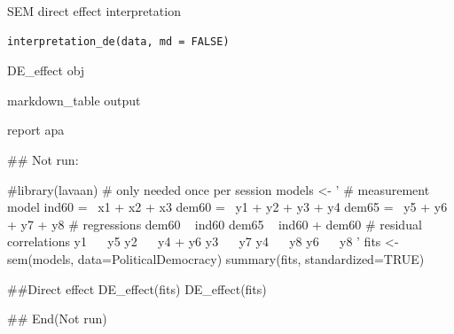 \documentclass[a4paper]{book}
\begin{document}
%
\begin{Description}
SEM direct effect interpretation
\end{Description}
%
\begin{Usage}
\begin{verbatim}
interpretation_de(data, md = FALSE)
\end{verbatim}
\end{Usage}
%
\begin{Arguments}
\begin{ldescription}
\item[\code{data}] DE\_effect obj

\item[\code{md}] markdown\_table output
\end{ldescription}
\end{Arguments}
%
\begin{Value}
report apa
\end{Value}
%
\begin{Examples}
\begin{ExampleCode}

\#\# Not run: 

 #library(lavaan) # only needed once per session
 models <- '
   # measurement model
     ind60 =~ x1 + x2 + x3
     dem60 =~ y1 + y2 + y3 + y4
     dem65 =~ y5 + y6 + y7 + y8
 # regressions
     dem60 ~ ind60
     dem65 ~ ind60 + dem60
   # residual correlations
     y1 ~~ y5
     y2 ~~ y4 + y6
     y3 ~~ y7
     y4 ~~ y8
    y6 ~~ y8
 '
 fits <- sem(models, data=PoliticalDemocracy)
 summary(fits, standardized=TRUE)

 ##Direct effect
 DE_effect(fits)
 DE_effect(fits)%


## End(Not run)

\end{ExampleCode}
\end{Examples}
\end{document}
